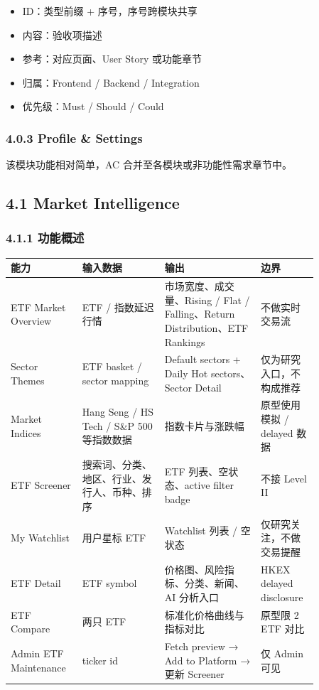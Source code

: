 \begin{itemize}
\item ID：类型前缀 + 序号，序号跨模块共享
\item 内容：验收项描述
\item 参考：对应页面、User Story 或功能章节
\item 归属：Frontend / Backend / Integration
\item 优先级：Must / Should / Could
\end{itemize}

\subsubsection{4.0.3 Profile \& Settings}

该模块功能相对简单，AC 合并至各模块或非功能性需求章节中。

\subsection{4.1 Market Intelligence}

\subsubsection{4.1.1 功能概述}

\begingroup
\small
\begin{longtable}{L{0.18\linewidth}L{0.24\linewidth}L{0.28\linewidth}L{0.16\linewidth}}
\toprule
\textbf{能力} & \textbf{输入数据} & \textbf{输出} & \textbf{边界} \\
\midrule
ETF Market Overview & ETF / 指数延迟行情 & 市场宽度、成交量、Rising / Flat / Falling、Return Distribution、ETF Rankings & 不做实时交易流 \\
Sector Themes & ETF basket / sector mapping & Default sectors + Daily Hot sectors、Sector Detail & 仅为研究入口，不构成推荐 \\
Market Indices & Hang Seng / HS Tech / S\&P 500 等指数数据 & 指数卡片与涨跌幅 & 原型使用模拟 / delayed 数据 \\
ETF Screener & 搜索词、分类、地区、行业、发行人、币种、排序 & ETF 列表、空状态、active filter badge & 不接 Level II \\
My Watchlist & 用户星标 ETF & Watchlist 列表 / 空状态 & 仅研究关注，不做交易提醒 \\
ETF Detail & ETF symbol & 价格图、风险指标、分类、新闻、AI 分析入口 & HKEX delayed disclosure \\
ETF Compare & 两只 ETF & 标准化价格曲线与指标对比 & 原型限 2 ETF 对比 \\
Admin ETF Maintenance & ticker id & Fetch preview → Add to Platform → 更新 Screener & 仅 Admin 可见 \\
\bottomrule
\end{longtable}
\endgroup

